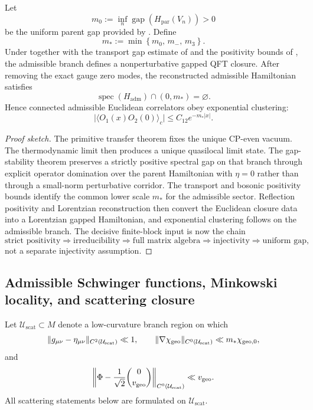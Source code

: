 \begin{theorem}
\label{thm:nonperturbative-admissible-qft}
Let
\[
m_0:=\inf_n \operatorname{gap}(H_{\mathrm{par}}(V_n))>0
\]
be the uniform parent gap provided by . Define
\[
m_*:=\min\left\{m_0,\,m_-,\,m_3\right\}.
\]
Under 
together with the transport gap estimate of  and the positivity
bounds of , the admissible branch defines a nonperturbative
gapped QFT closure. After removing the exact gauge zero modes, the reconstructed admissible
Hamiltonian satisfies
\[
\operatorname{spec}(H_{\mathrm{adm}})\cap(0,m_*)=\varnothing.
\]
Hence connected admissible Euclidean correlators obey exponential clustering:
\[
\bigl|\langle O_1(x)O_2(0)\rangle_c\bigr|
\le
C_{12}e^{-m_*|x|}.
\]
\end{theorem}

\begin{proof}[Proof sketch]
The primitive transfer theorem fixes the unique CP-even vacuum. The thermodynamic limit then
produces a unique quasilocal limit state. The gap-stability theorem preserves a strictly positive
spectral gap on that branch through explicit operator domination over the parent Hamiltonian with
$\eta=0$ rather than through a small-norm perturbative corridor. The transport and bosonic
positivity bounds identify the common lower scale $m_*$ for the admissible sector. Reflection
positivity and Lorentzian reconstruction then convert the Euclidean closure data into a Lorentzian
gapped Hamiltonian, and exponential clustering follows on the admissible branch. The decisive
finite-block input is now the chain
\[
\text{strict positivity}\Rightarrow\text{irreducibility}\Rightarrow\text{full matrix algebra}
\Rightarrow\text{injectivity}\Rightarrow\text{uniform gap},
\]
not a separate injectivity assumption.
\end{proof}

\subsection{Admissible Schwinger functions, Minkowski locality, and scattering closure}

\begin{definition}
\label{def:laboratory-scattering-sector}
Let $\mathcal U_{\mathrm{scat}}\subset M$ denote a low-curvature branch region on which
\[
\|g_{\mu\nu}-\eta_{\mu\nu}\|_{C^2(\mathcal U_{\mathrm{scat}})}\ll 1,
\qquad
\|\nabla\chi_{\mathrm{geo}}\|_{C^0(\mathcal U_{\mathrm{scat}})}\ll m_*\chi_{\mathrm{geo},0},
\]
and
\[
\left\|
\Phi-\frac{1}{\sqrt2}\binom{0}{v_{\mathrm{geo}}}
\right\|_{C^0(\mathcal U_{\mathrm{scat}})}
\ll
v_{\mathrm{geo}}.
\]
All scattering statements below are formulated on $\mathcal U_{\mathrm{scat}}$.
\end{definition}

